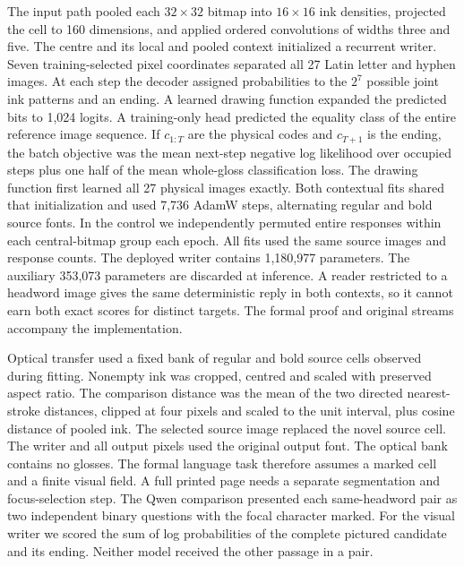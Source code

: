 \documentclass[12pt,a4paper]{article}
\providecommand{\DIFadd}[1]{{\protect\color{blue} \sf #1}} %
\begin{document}
\DIFadd{The input path pooled each $32\times32$ bitmap into $16\times16$ ink densities, projected the cell to 160 dimensions, and applied ordered convolutions of widths three and five. The centre and its local and pooled context initialized a recurrent writer. Seven training-selected pixel coordinates separated all 27 Latin letter and hyphen images. At each step the decoder assigned probabilities to the $2^7$ possible joint ink patterns and an ending. A learned drawing function expanded the predicted bits to 1,024 logits. A training-only head predicted the equality class of the entire reference image sequence. If $c_{1:T}$ are the physical codes and $c_{T+1}$ is the ending, the batch objective was the mean next-step negative log likelihood over occupied steps plus one half of the mean whole-gloss classification loss. The drawing function first learned all 27 physical images exactly. Both contextual fits shared that initialization and used 7,736 AdamW steps, alternating regular and bold source fonts. In the control we independently permuted entire responses within each central-bitmap group each epoch. All fits used the same source images and response counts. The deployed writer contains 1,180,977 parameters. The auxiliary 353,073 parameters are discarded at inference. A reader restricted to a headword image gives the same deterministic reply in both contexts, so it cannot earn both exact scores for distinct targets. The formal proof and original streams accompany the implementation.
}

\DIFadd{Optical transfer used a fixed bank of regular and bold source cells observed during fitting. Nonempty ink was cropped, centred and scaled with preserved aspect ratio. The comparison distance was the mean of the two directed nearest-stroke distances, clipped at four pixels and scaled to the unit interval, plus cosine distance of pooled ink. The selected source image replaced the novel source cell. The writer and all output pixels used the original output font. The optical bank contains no glosses. The formal language task therefore assumes a marked cell and a finite visual field. A full printed page needs a separate segmentation and focus-selection step. The Qwen comparison presented each same-headword pair as two independent binary questions with the focal character marked. For the visual writer we scored the sum of log probabilities of the complete pictured candidate and its ending. Neither model received the other passage in a pair.
}
\end{document}

